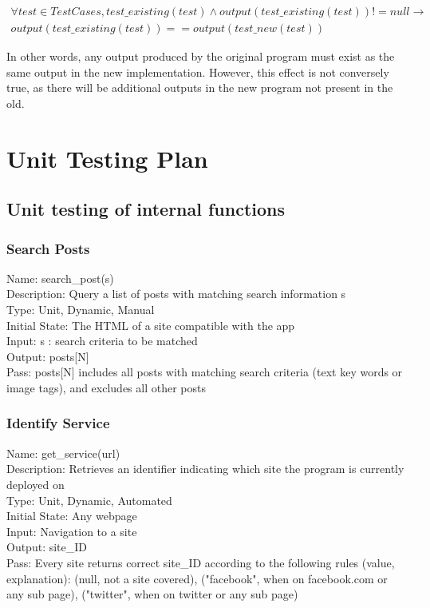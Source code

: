 \documentclass[12pt, titlepage]{article}
\begin{document}
\begin{enumerate}
\begin{multline}
\forall test \in TestCases, test\_existing(test) \wedge output(test\_existing(test)) != null  \rightarrow  \\ 
output(test\_existing(test)) == output(test\_new(test))
\end{multline}

In other words, any output produced by the original program must exist as the same output in the new implementation. However, this effect is not conversely true, as there will be additional outputs in the new program not present in the old.

				
\section{Unit Testing Plan}
		
\subsection{Unit testing of internal functions}

\subsubsection{Search Posts}
Name: search\_post(s) \\
Description: Query a list of posts with matching search information s \\
Type: Unit, Dynamic, Manual \\
Initial State: The HTML of a site compatible with the app \\
Input: s : search criteria to be matched \\
Output: posts[N] \\
Pass: posts[N] includes all posts with matching search criteria (text key words or image tags), and excludes all other posts \\
\subsubsection{Identify Service}
Name: get\_service(url) \\
Description: Retrieves an identifier indicating which site the program is currently deployed on \\
Type: Unit, Dynamic, Automated \\
Initial State: Any webpage \\
Input: Navigation to a site \\
Output: site\_ID \\
Pass: Every site returns correct site\_ID according to the following rules (value, explanation): (null, not a site covered), ("facebook", when on facebook.com or any sub page), ("twitter", when on twitter or any sub page) \\

\end{enumerate}
\end{document}

